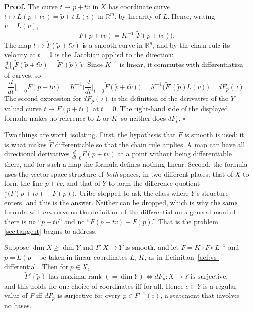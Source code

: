 \documentclass[11pt]{report}
\makeatletter
\newcounter{thmcounter}[section]
\renewenvironment{proof}[1][Proof]{\noindent\textbf{#1.} }{\hfill$\square$\par\vspace{5pt}}
\newcommand{\thmlabel}[1]{\edef\@currentlabel{\arabic{section}.\arabic{thmcounter}}\label{#1}}
\makeatother
\begin{document}
\begin{proof}
The curve $t \mapsto p + tv$ in $X$ has coordinate curve $t \mapsto L(p+tv) = \tilde p + t\,L(v)$ in $\mathbb{R}^m$, by linearity of $L$. Hence, writing $\tilde v = L(v)$,
\[
F(p+tv) = K^{-1}\big( \widetilde F(\tilde p + t \tilde v) \big).
\]
The map $t \mapsto \widetilde F(\tilde p + t\tilde v)$ is a smooth curve in $\mathbb{R}^n$, and by the chain rule its velocity at $t = 0$ is the Jacobian applied to the direction: $\frac{d}{dt}\big|_0 \widetilde F(\tilde p + t\tilde v) = \widetilde F'(\tilde p)\,\tilde v$. Since $K^{-1}$ is linear, it commutes with differentiation of curves, so
\[
\frac{d}{dt}\Big|_{t=0} F(p+tv) = K^{-1}\Big( \frac{d}{dt}\Big|_{t=0} \widetilde F(\tilde p + t\tilde v) \Big) = K^{-1}\big( \widetilde F'(\tilde p) L(v) \big) = dF_p(v).
\]
The second expression for $dF_p(v)$ is the definition of the derivative of the $Y$-valued curve $t \mapsto F(p+tv)$ at $t = 0$. The right-hand side of the displayed formula makes no reference to $L$ or $K$, so neither does $dF_p$.
\end{proof}

\begin{rembox}\label{rem:vector-spaces-4}
Two things are worth isolating. First, the hypothesis that $F$ is smooth is used: it is what makes $\widetilde F$ differentiable so that the chain rule applies. A map can have all directional derivatives $\frac{d}{dt}\big|_0 F(p+tv)$ at a point without being differentiable there, and for such a map the formula defines nothing linear. Second, the formula uses the vector space structure of \emph{both} spaces, in two different places: that of $X$ to form the line $p + tv$, and that of $Y$ to form the difference quotient $\frac1t\big(F(p+tv) - F(p)\big)$. Uribe stopped to ask the class where $Y$'s structure enters, and this is the answer. Neither can be dropped, which is why the same formula will \emph{not} serve as the definition of the differential on a general manifold: there is no ``$p + tv$'' and no ``$F(p+tv) - F(p)$.'' That is the problem \ref{sec:tangent} begins to address.
\end{rembox}

\begin{corbox}\thmlabel{cor:vs-regular}
Suppose $\dim X \ge \dim Y$ and $F : X \to Y$ is smooth, and let $\widetilde F = K \circ F \circ L^{-1}$ and $\tilde p = L(p)$ be taken in linear coordinates $L$, $K$, as in Definition~\ref{def:vs-differential}. Then for $p \in X$,
\[
\widetilde F'(\tilde p) \text{ has maximal rank } (= \dim Y) \iff dF_p : X \to Y \text{ is surjective},
\]
and this holds for one choice of coordinates iff for all. Hence $c \in Y$ is a regular value of $F$ iff $dF_p$ is surjective for every $p \in F^{-1}(c)$, a statement that involves no bases.
\end{corbox}
\end{document}
